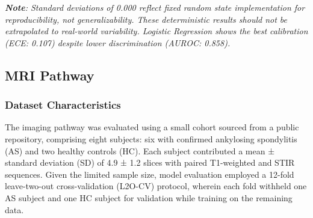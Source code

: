 \documentclass[12pt, a4paper]{article}
\begin{document}
\begin{table}[H]
\centering
\normalsize
\caption{Calibration Metrics Across Models}
\label{tab:calibration_metrics}
\end{table}

\textit{\textbf{Note}: Standard deviations of 0.000 reflect fixed random state implementation for reproducibility, not generalizability. These deterministic results should not be extrapolated to real-world variability. Logistic Regression shows the best calibration (ECE: 0.107) despite lower discrimination (AUROC: 0.858).}

\subsection{MRI Pathway}

\subsubsection{Dataset Characteristics}
The imaging pathway was evaluated using a small cohort sourced from a public repository, comprising eight subjects: six with confirmed ankylosing spondylitis (AS) and two healthy controls (HC). Each subject contributed a mean ± standard deviation (SD) of 4.9 ± 1.2 slices with paired T1-weighted and STIR sequences. Given the limited sample size, model evaluation employed a 12-fold leave-two-out cross-validation (L2O-CV) protocol, wherein each fold withheld one AS subject and one HC subject for validation while training on the remaining data.
\end{document}
